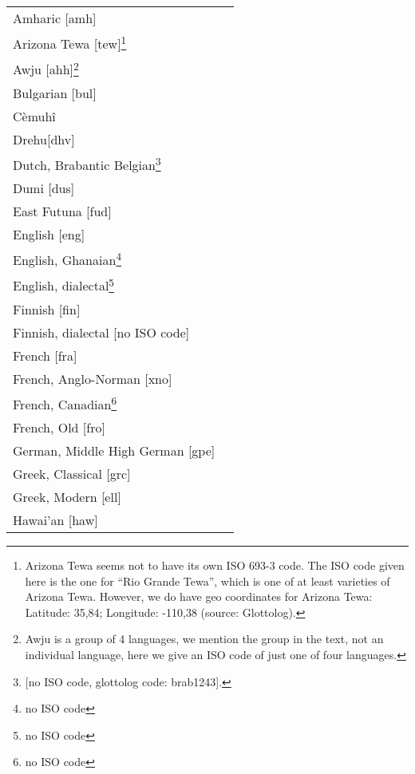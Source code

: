 ﻿\documentclass[output=paper]{langsci/langscibook}
\begin{document}
\begin{tabularx}{.45\textwidth}{ l Q }
Amharic [amh]\\
Arizona Tewa [tew]\footnote{Arizona Tewa seems not to have its own ISO 693-3
code. The ISO code given here is the one for ``Rio Grande Tewa'', which is
one of at least varieties of Arizona Tewa. However, we do have geo
coordinates for Arizona Tewa: Latitude: 35,84; Longitude: -110,38 (source:
Glottolog).}\\
Awju [ahh]\footnote{Awju is a group of 4 languages, we mention the group in the
text, not an individual language, here we give an ISO code of just one of
four languages.}\\
Bulgarian [bul]\\
Cèmuhî\\
Drehu[dhv]\\
Dutch, Brabantic Belgian\footnote{[no ISO code, glottolog code: brab1243].}\\
Dumi [dus]\\
East Futuna [fud]\\
English [eng]\\
English, Ghanaian\footnote{no ISO code}\\
English, dialectal\footnote{no ISO code}\\
Finnish [fin]\\
Finnish, dialectal [no ISO code]\\
French [fra]\\
French, Anglo-Norman [xno]\\
French, Canadian\footnote{no ISO code}\\
French, Old [fro]\\
German, Middle High German [gpe]\\
Greek, Classical [grc]\\
Greek, Modern [ell]\\
Hawai'an [haw]\\
\end{tabularx}
\end{document}
